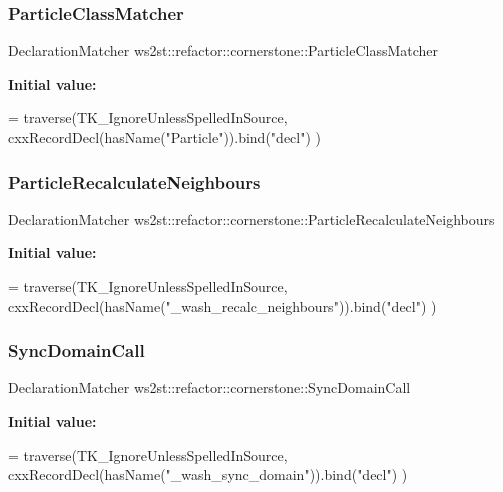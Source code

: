 \subsubsection{\texorpdfstring{Particle\+Class\+Matcher}{ParticleClassMatcher}}
{\footnotesize\ttfamily Declaration\+Matcher ws2st\+::refactor\+::cornerstone\+::\+Particle\+Class\+Matcher}

{\bfseries Initial value\+:}
\begin{DoxyCode}
= traverse(TK\_IgnoreUnlessSpelledInSource, 
                cxxRecordDecl(hasName(\textcolor{stringliteral}{"Particle"})).bind(\textcolor{stringliteral}{"decl"})
            )
\end{DoxyCode}
\mbox{\label{namespacews2st_1_1refactor_1_1cornerstone_a19de4c5d437c657af0931399249949c1}} 
\subsubsection{\texorpdfstring{Particle\+Recalculate\+Neighbours}{ParticleRecalculateNeighbours}}
{\footnotesize\ttfamily Declaration\+Matcher ws2st\+::refactor\+::cornerstone\+::\+Particle\+Recalculate\+Neighbours}

{\bfseries Initial value\+:}
\begin{DoxyCode}
= traverse(TK\_IgnoreUnlessSpelledInSource, 
                cxxRecordDecl(hasName(\textcolor{stringliteral}{"\_wash\_recalc\_neighbours"})).bind(\textcolor{stringliteral}{"decl"})
            )
\end{DoxyCode}
\mbox{\label{namespacews2st_1_1refactor_1_1cornerstone_a264c2c5047907175a7d5380ff244f957}} 
\subsubsection{\texorpdfstring{Sync\+Domain\+Call}{SyncDomainCall}}
{\footnotesize\ttfamily Declaration\+Matcher ws2st\+::refactor\+::cornerstone\+::\+Sync\+Domain\+Call}

{\bfseries Initial value\+:}
\begin{DoxyCode}
= traverse(TK\_IgnoreUnlessSpelledInSource, 
                cxxRecordDecl(hasName(\textcolor{stringliteral}{"\_wash\_sync\_domain"})).bind(\textcolor{stringliteral}{"decl"})
            )
\end{DoxyCode}

